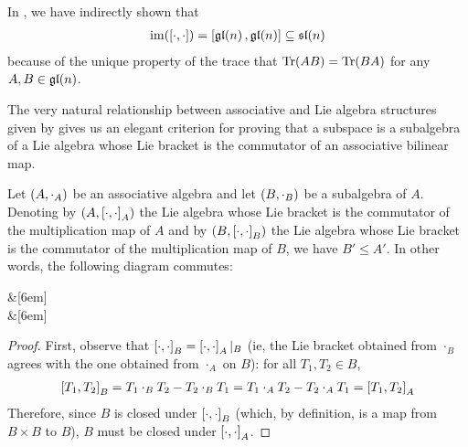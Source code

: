 \begin{remark}
    In , we have indirectly shown that
    \begin{align*}
        \operatorname{im}\!\left( \left[ \cdot, \cdot \right] \right) = \left[ \mathfrak{gl}\!\left( n \right), \mathfrak{gl}\!\left( n \right) \right] \subseteq \mathfrak{sl}\!\left( n \right)
    \end{align*}
    because of the unique property of the trace that $\operatorname{Tr}\!\left( AB \right) = \operatorname{Tr}\!\left( BA \right)$ for any $A, B \in \mathfrak{gl}\!\left( n \right)$.
\end{remark}

The very natural relationship between associative and Lie algebra structures given by  gives us an elegant criterion for proving that a subspace is a subalgebra of a Lie algebra whose Lie bracket is the commutator of an associative bilinear map.

\begin{boxproposition}\label{Ch1:Prop:Subalg_Commbracket}
    Let $\left( A, \cdot_A \right)$ be an associative algebra and let $\left( B, \cdot_B \right)$ be a subalgebra of $A$. Denoting by $\left( A, \left[ \cdot, \cdot \right]_A \right)$ the Lie algebra whose Lie bracket is the commutator of the multiplication map of $A$ and by $\left( B, \left[ \cdot, \cdot \right]_B \right)$ the Lie algebra whose Lie bracket is the commutator of the multiplication map of $B$, we have $B' \leq A'$. In other words, the following diagram commutes:

    \begin{cd}
        \arrow[r] &[6em]
         \\[1em]
        \arrow[r]
         &[6em]
        \label{Ch1:cd:Subalg_Commbracket}
    \end{cd}
\end{boxproposition}
\begin{proof}
    First, observe that $\left[ \cdot, \cdot \right]_B = \left[ \cdot, \cdot \right]_A\vert_B$ (ie, the Lie bracket obtained from $\cdot_B$ agrees with the one obtained from $\cdot_A$ on $B$): for all $T_1, T_2 \in B$,
    \begin{align*}
        \left[ T_1, T_2 \right]_B = T_1 \cdot_B T_2 - T_2 \cdot_B T_1 = T_1 \cdot_A T_2 - T_2 \cdot_A T_1 = \left[ T_1, T_2 \right]_A
    \end{align*}
    Therefore, since $B$ is closed under $\left[ \cdot, \cdot \right]_B$ (which, by definition, is a map from $B \times B$ to $B$), $B$ must be closed under $\left[ \cdot, \cdot \right]_A$.
\end{proof}

